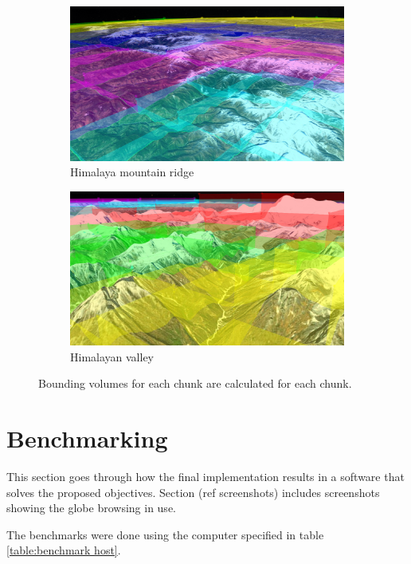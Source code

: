 \begin{figure}[h]
\begin{subfigure}[bt]{0.45\textwidth}
        \includegraphics[width=\textwidth]{figures/results/culling/bbox_himalaya3.png}
        \caption{Himalaya mountain ridge}
    \end{subfigure}
    \begin{subfigure}[bt]{0.45\textwidth}
        \includegraphics[width=\textwidth]{figures/results/culling/bbox_himalaya.png}
        \caption{Himalayan valley}
    \end{subfigure}
    \caption{Bounding volumes for each chunk are calculated for each chunk.}
    \label{fig:boundingvolume}
\end{figure}


\clearpage
\section{Benchmarking}
\FloatBarrier
This section goes through how the final implementation results in a software that solves the proposed objectives. Section (ref screenshots)  includes screenshots showing the globe browsing in use.

The benchmarks were done using the computer specified in table \ref{table:benchmark host}.

